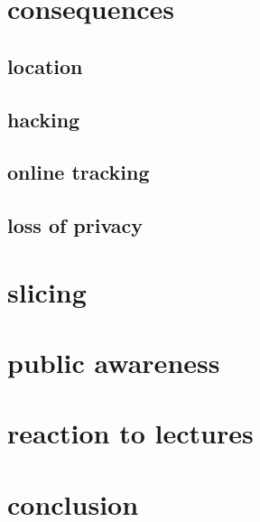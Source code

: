 \documentclass[10pt,a4paper,column]{article}
\begin{document}
\section{consequences}
\subsection{location}
\subsection{hacking}
\subsection{online tracking}
\subsection{loss of privacy}
\section{slicing} 
\section{public awareness} 
\section{reaction to lectures}
\section{conclusion} 





\end{document}
